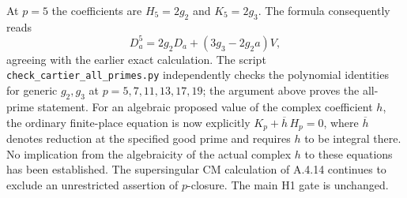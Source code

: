At $p=5$ the coefficients are $H_5=2g_2$ and $K_5=2g_3$.
The formula consequently reads
\[
 D_a^5=2g_2D_a+(3g_3-2g_2a)V,
\]
agreeing with the earlier exact calculation.
The script \texttt{check\_cartier\_all\_primes.py} independently
checks the polynomial identities for generic $g_2,g_3$ at
$p=5,7,11,13,17,19$; the argument above proves the all-prime
statement. For an algebraic proposed value of the complex
coefficient $h$, the ordinary finite-place equation is now
explicitly $K_p+\overline h\,H_p=0$, where $\overline h$ denotes
reduction at the specified good prime and requires $h$ to be
integral there. No implication from the algebraicity of the
actual complex $h$ to these equations has been established.
The supersingular CM calculation of A.4.14 continues to exclude
an unrestricted assertion of $p$-closure. The main H1 gate is
unchanged.

